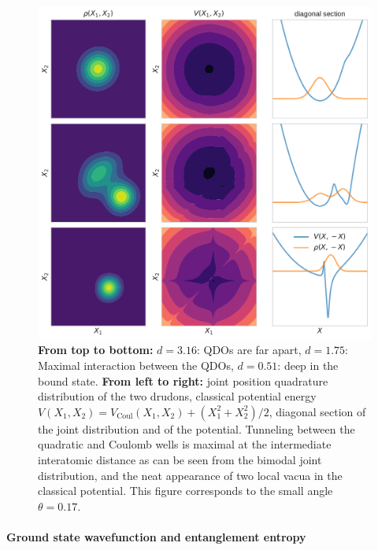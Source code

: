 \documentclass[reprint, amsmath, amssymb, floatfix, aps, pra]{revtex4-2}
\begin{document}
    \begin{figure}
        \includegraphics[scale=0.85]{figures/classical_potential_small_angle.pdf}
        \caption{\label{fig:classical_potential_small_angle}\textbf{From top to bottom:} $d=3.16$: QDOs are far apart, $d=1.75$: Maximal interaction between the QDOs, $d=0.51$: deep in the bound state. \textbf{From left to right:} joint position quadrature distribution of the two drudons, classical potential energy $V(X_1,X_2) = V_\text{Coul}(X_1,X_2) + (X_1^2 + X_2^2) /2$, diagonal section of the joint distribution and of the potential. Tunneling between the quadratic and Coulomb wells is maximal at the intermediate interatomic distance as can be seen from the bimodal joint distribution, and the neat appearance of two local vacua in the classical potential. This figure corresponds to the small angle $\theta=0.17$.}
    \end{figure}

\paragraph*{Ground state wavefunction and entanglement entropy}
\end{document}
